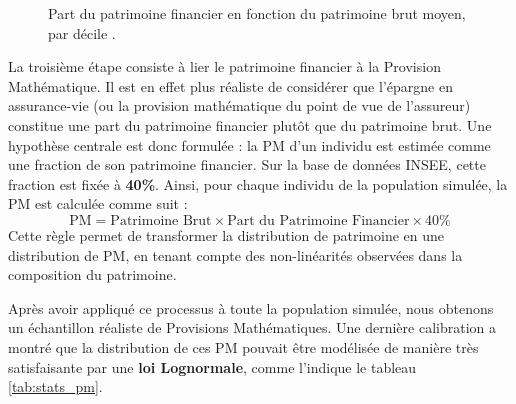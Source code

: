 \begin{figure}[H]
    \centering
    \caption{Part du patrimoine financier en fonction du patrimoine brut moyen, par décile \cite{insee_patrimoine_age}.}
    \label{fig:composition_patrimoine}
\end{figure}

La troisième étape consiste à lier le patrimoine financier à la Provision Mathématique. Il est en effet plus réaliste de considérer que l'épargne en assurance-vie (ou la provision mathématique du point de vue de l'assureur) constitue une part du patrimoine financier plutôt que du patrimoine brut. Une hypothèse centrale est donc formulée : la PM d'un individu est estimée comme une fraction de son patrimoine financier. Sur la base de données INSEE, cette fraction est fixée à \textbf{40\%}. Ainsi, pour chaque individu de la population simulée, la PM est calculée comme suit :
$$ \text{PM} = \text{Patrimoine Brut} \times \text{Part du Patrimoine Financier} \times 40\% $$
Cette règle permet de transformer la distribution de patrimoine en une distribution de PM, en tenant compte des non-linéarités observées dans la composition du patrimoine.

Après avoir appliqué ce processus à toute la population simulée, nous obtenons un échantillon réaliste de Provisions Mathématiques. Une dernière calibration a montré que la distribution de ces PM pouvait être modélisée de manière très satisfaisante par une \textbf{loi Lognormale}, comme l'indique le tableau \ref{tab:stats_pm}.

